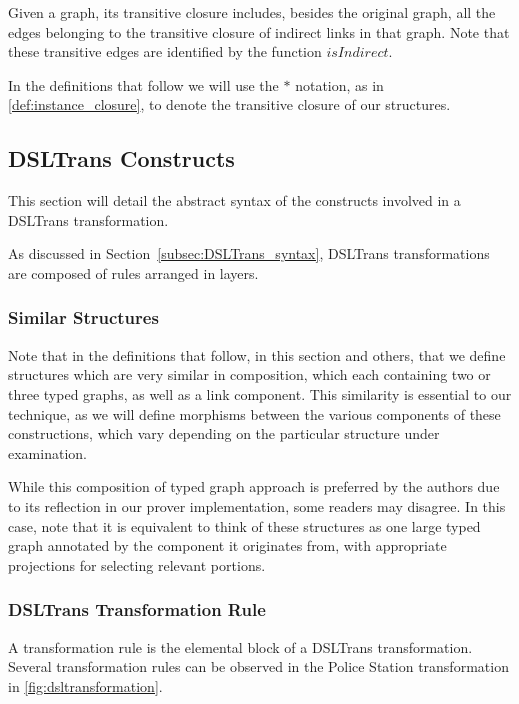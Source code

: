 Given a graph, its transitive closure includes, besides the original graph, all the edges belonging to the transitive closure of indirect links in that graph. Note that these transitive edges are identified by the function $\mathit{isIndirect}$.

In the definitions that follow we will use the $*$ notation, as in \cref{def:instance_closure}, to denote the transitive closure of our structures.



\subsection{DSLTrans Constructs}
\label{sec:DSLTrans_formal}

This section will detail the abstract syntax of the constructs involved in a DSLTrans transformation.

As discussed in Section~\ref{subsec:DSLTrans_syntax}, DSLTrans transformations are composed of rules arranged in layers.

\subsubsection{Similar Structures}

Note that in the definitions that follow, in this section and others, that we define structures which are very similar in composition, which each containing two or three typed graphs, as well as a link component. This similarity is essential to our technique, as we will define morphisms between the various components of these constructions, which vary depending on the particular structure under examination.

While this composition of typed graph approach is preferred by the authors due to its reflection in our prover implementation, some readers may disagree. In this case, note that it is equivalent to think of these structures as one large typed graph annotated by the component it originates from, with appropriate projections for selecting relevant portions.


\subsubsection*{DSLTrans Transformation Rule}

A transformation rule is the elemental block of a DSLTrans transformation. Several transformation rules can be observed in the Police Station transformation in \cref{fig:dsltransformation}.

